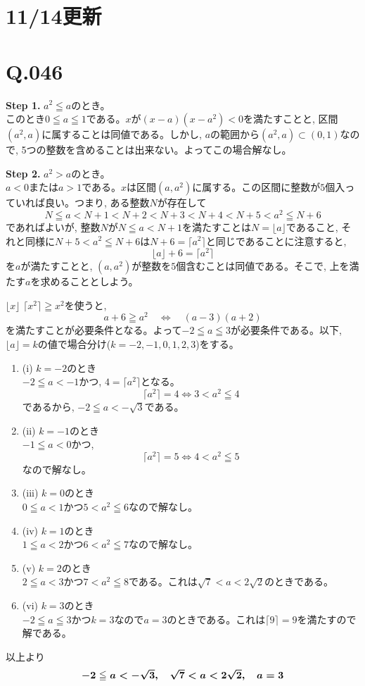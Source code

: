 \documentclass[twocolumn]{jbook}
\theoremstyle{definition}
\newcommand{\bolm}[1]{{\mbox{\boldmath $#1$}}}
\newcommand{\dou}{\Leftrightarrow}
\newcommand{\ben}{\begin{enumerate}}
\newcommand{\een}{\end{enumerate}}
\renewcommand{\leq}{\leqq}
\renewcommand{\geq}{\geqq}
\begin{document}
\section*{11/14更新}
\section*{Q.046}
\textbf{Step 1.} $a^2\leq a$のとき。\\
このとき$0\leq a\leq 1$である。$x$が$(x-a)(x-a^2)<0$を満たすことと, 区間$(a^2,a)$に属することは同値である。しかし, $a$の範囲から$(a^2,a)\subset (0,1)$なので, 5つの整数を含めることは出来ない。よってこの場合解なし。

\textbf{Step 2.} $a^2>a$のとき。\\
$a<0$または$a>1$である。$x$は区間$(a,a^2)$に属する。この区間に整数が$5$個入っていれば良い。つまり, ある整数$N$が存在して
\[N\leq a < N+1<N+2<N+3<N+4<N+5<a^2\leq N+6\]
であればよいが, 整数$N$が$N\leq a<N+1$を満たすことは$N=\lfloor a\rfloor$であること, それと同様に$N+5<a^2\leq N+6$は$N+6=\lceil a^2 \rceil$と同じであることに注意すると, 
\[\lfloor a\rfloor + 6 = \lceil a^2\rceil\]
を$a$が満たすことと, $(a,a^2)$が整数を$5$個含むことは同値である。そこで, 上を満たす$a$を求めることとしよう。\par
$\lfloor x\rfloor$ $\lceil x^2 \rceil \geq x^2 $を使うと,
\[a + 6\geq a^2\quad \dou \quad (a-3)(a+2)\]
を満たすことが必要条件となる。よって$-2\leq a\leq 3$が必要条件である。以下, $\lfloor a\rfloor=k$の値で場合分け($k=-2,-1,0,1,2,3$)をする。
\ben
\item[(i)] $k=-2$のとき\\
$-2\leq a<-1$かつ, $4=\lceil a^2\rceil$となる。
\[\lceil a^2\rceil =4 \dou 3< a^2 \leq 4\]
であるから, $-2\leq a < -\sqrt{3}$である。
\item[(ii)] $k=-1$のとき\\
$-1\leq a<0$かつ,
\[\lceil a^2\rceil = 5 \dou 4< a^2\leq 5\]
なので解なし。
\item[(iii)] $k=0$のとき\\
$0\leq a<1$かつ$5<a^2\leq 6$なので解なし。
\item[(iv)] $k=1$のとき\\
$1\leq a<2$かつ$6<a^2\leq 7$なので解なし。\\
\item[(v)] $k=2$のとき\\
$2\leq a<3$かつ$7<a^2\leq 8$である。これは$\sqrt{7} < a < 2\sqrt{2}$のときである。
\item[(vi)] $k=3$のとき\\
$-2\leq a\leq 3$かつ$k=3$なので$a=3$のときである。これは$\lceil 9 \rceil = 9$を満たすので解である。
\een
以上より
\[\bolm{ -2\leq a<-\sqrt{3},\quad \sqrt{7}<a<2\sqrt{2},\quad a=3 }\]
\end{document}
